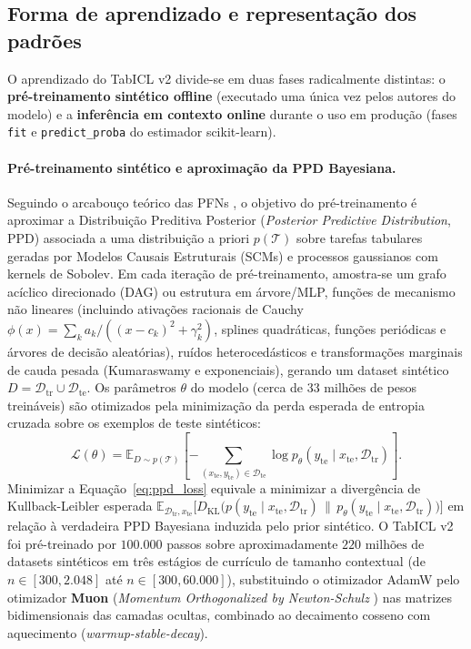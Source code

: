 \documentclass[11pt,a4paper]{article}
\begin{document}
\subsection{Forma de aprendizado e representação dos padrões}
\label{sec:aprendizado}

O aprendizado do TabICL v2 divide-se em duas fases radicalmente distintas: o \textbf{pré-treinamento sintético offline} (executado uma única vez pelos autores do modelo) e a \textbf{inferência em contexto online} durante o uso em produção (fases \texttt{fit} e \texttt{predict\_proba} do estimador scikit-learn).

\paragraph{Pré-treinamento sintético e aproximação da PPD Bayesiana.}
Seguindo o arcabouço teórico das PFNs \cite{hollmann2023tabpfn,qu2025tabicl}, o objetivo do pré-treinamento é aproximar a Distribuição Preditiva Posterior (\emph{Posterior Predictive Distribution}, PPD) associada a uma distribuição a priori $p(\mathcal{T})$ sobre tarefas tabulares geradas por Modelos Causais Estruturais (SCMs) e processos gaussianos com kernels de Sobolev. Em cada iteração de pré-treinamento, amostra-se um grafo acíclico direcionado (DAG) ou estrutura em árvore/MLP, funções de mecanismo não lineares (incluindo ativações racionais de Cauchy $\phi(x) = \sum_k a_k / ((x - c_k)^2 + \gamma_k^2)$, splines quadráticas, funções periódicas e árvores de decisão aleatórias), ruídos heterocedásticos e transformações marginais de cauda pesada (Kumaraswamy e exponenciais), gerando um dataset sintético $D = \mathcal{D}_{\mathrm{tr}} \cup \mathcal{D}_{\mathrm{te}}$. Os parâmetros $\theta$ do modelo (cerca de $33\text{ milhões}$ de pesos treináveis) são otimizados pela minimização da perda esperada de entropia cruzada sobre os exemplos de teste sintéticos:
\begin{equation}
    \mathcal{L}(\theta) = \mathbb{E}_{D \sim p(\mathcal{T})} \left[ - \sum_{(x_{\mathrm{te}}, y_{\mathrm{te}}) \in \mathcal{D}_{\mathrm{te}}} \log p_\theta(y_{\mathrm{te}} \mid x_{\mathrm{te}}, \mathcal{D}_{\mathrm{tr}}) \right].
    \label{eq:ppd_loss}
\end{equation}
Minimizar a Equação~\eqref{eq:ppd_loss} equivale a minimizar a divergência de Kullback-Leibler esperada $\mathbb{E}_{\mathcal{D}_{\mathrm{tr}}, x_{\mathrm{te}}} \big[ D_{\mathrm{KL}}\big( p(y_{\mathrm{te}} \mid x_{\mathrm{te}}, \mathcal{D}_{\mathrm{tr}}) \,\|\, p_\theta(y_{\mathrm{te}} \mid x_{\mathrm{te}}, \mathcal{D}_{\mathrm{tr}}) \big) \big]$ em relação à verdadeira PPD Bayesiana induzida pelo prior sintético. O TabICL v2 foi pré-treinado por $100.000$ passos sobre aproximadamente $220\text{ milhões}$ de datasets sintéticos em três estágios de currículo de tamanho contextual (de $n \in [300, 2.048]$ até $n \in [300, 60.000]$), substituindo o otimizador AdamW pelo otimizador \textbf{Muon} (\emph{Momentum Orthogonalized by Newton-Schulz} \cite{jordan2024muon}) nas matrizes bidimensionais das camadas ocultas, combinado ao decaimento cosseno com aquecimento (\emph{warmup-stable-decay}).
\end{document}
